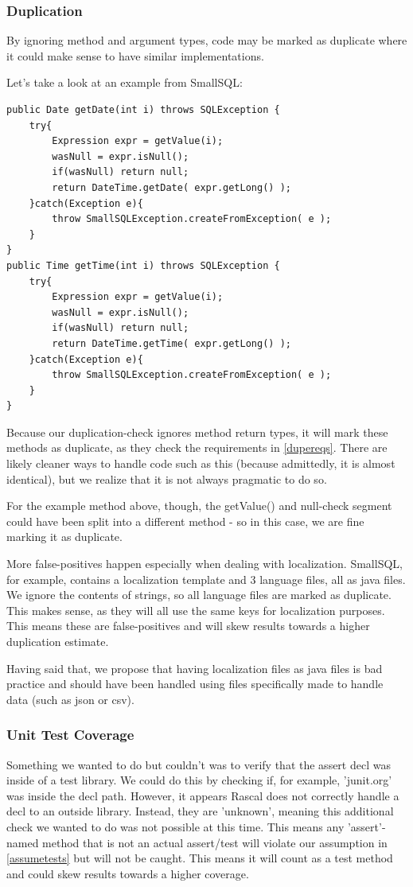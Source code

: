 \documentclass{article}
\begin{document}
\subsubsection{Duplication}
By ignoring method and argument types, code may be marked as duplicate where it could make sense to have similar implementations.

Let's take a look at an example from SmallSQL:

\begin{lstlisting}
public Date getDate(int i) throws SQLException {
    try{
		Expression expr = getValue(i);
        wasNull = expr.isNull();
		if(wasNull) return null;
		return DateTime.getDate( expr.getLong() );
    }catch(Exception e){
        throw SmallSQLException.createFromException( e );
    }
}
public Time getTime(int i) throws SQLException {
    try{
		Expression expr = getValue(i);
        wasNull = expr.isNull();
		if(wasNull) return null;
		return DateTime.getTime( expr.getLong() );
    }catch(Exception e){
        throw SmallSQLException.createFromException( e );
    }
}
\end{lstlisting}

Because our duplication-check ignores method return types, it will mark these methods as duplicate, as they check the requirements in \ref{dupereqs}. 
There are likely cleaner ways to handle code such as this (because admittedly, it is almost identical), but we realize that it is not always pragmatic to do so. 

For the example method above, though, the getValue() and null-check segment could have been split into a different method - so in this case, we are fine marking it as duplicate.

More false-positives happen especially when dealing with localization. SmallSQL, for example, contains a localization template and 3 language files, all as java files. We ignore the contents of strings, so all language files are marked as duplicate. This makes sense, as they will all use the same keys for localization purposes. This means these are false-positives and will skew results towards a higher duplication estimate.

Having said that, we propose that having localization files as java files is bad practice and should have been handled using files specifically made to handle data (such as json or csv).

\subsubsection{Unit Test Coverage}
Something we wanted to do but couldn't was to verify that the assert decl was inside of a test library. We could do this by checking if, for example, 'junit.org' was inside the decl path. However, it appears Rascal does not correctly handle a decl to an outside library. Instead, they are 'unknown', meaning this additional check we wanted to do was not possible at this time. This means any 'assert'-named method that is not an actual assert/test will violate our assumption in \ref{assumetests} but will not be caught. This means it will count as a test method and could skew results towards a higher coverage.
\end{document}
